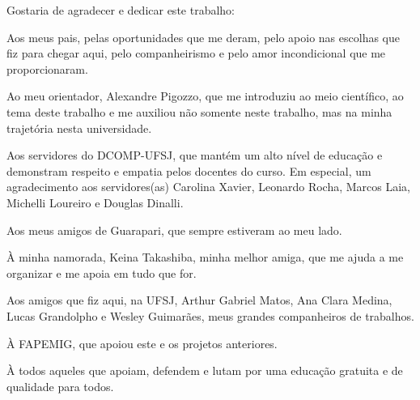 \begin{agradecimentos}
Gostaria de agradecer e dedicar este trabalho:

\noindent
Aos meus pais, pelas oportunidades que me deram, pelo apoio nas escolhas que fiz para chegar aqui, pelo companheirismo e pelo amor incondicional que me proporcionaram.

\noindent
Ao meu orientador, Alexandre Pigozzo, que me introduziu ao meio científico, ao tema deste trabalho e me auxiliou não somente neste trabalho, mas na minha trajetória nesta universidade.

\noindent
Aos servidores do DCOMP-UFSJ, que mantém um alto nível de educação e demonstram respeito e empatia pelos docentes do curso. Em especial, um agradecimento aos servidores(as) Carolina Xavier, Leonardo Rocha, Marcos Laia, Michelli Loureiro e Douglas Dinalli.

\noindent
Aos meus amigos de Guarapari, que sempre estiveram ao meu lado.

\noindent
À minha namorada, Keina Takashiba, minha melhor amiga, que me ajuda a me organizar e me apoia em tudo que for.

\noindent
Aos amigos que fiz aqui, na UFSJ, Arthur Gabriel Matos, Ana Clara Medina, Lucas Grandolpho e Wesley Guimarães, meus grandes companheiros de trabalhos.

\noindent
À FAPEMIG, que apoiou este e os projetos anteriores.

\noindent
À todos aqueles que apoiam, defendem e lutam por uma educação gratuita e de qualidade para todos.
	
\end{agradecimentos}

\begin{epigrafe}
	\vspace*{\fill}
	\begin{flushright}

		
	\end{flushright}
\end{epigrafe}

